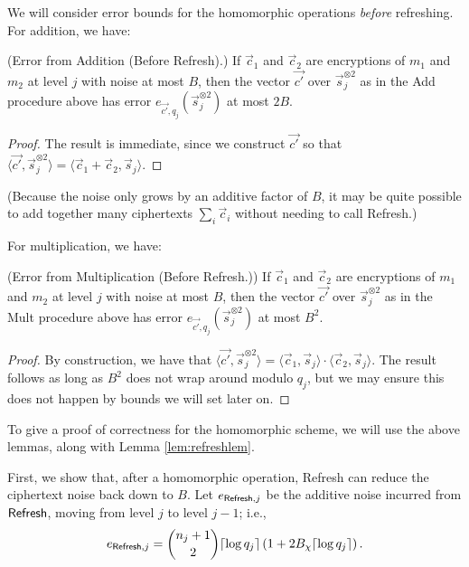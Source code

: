     We will consider error bounds for the homomorphic operations \emph{before} refreshing. For addition, we have:
    \begin{lemma} (Error from Addition (Before \textsf{Refresh}).)
        If $\vec{c}_1$ and $\vec{c}_2$ are encryptions of $m_1$ and $m_2$ at level $j$ with noise at most $B$, then the vector $\vec{c'}$ over $\vec{s}_j^{\otimes 2}$ as in the \textsf{Add} procedure above has error $e_{\vec{c'}, q_j}(\vec{s}_j^{\otimes 2})$ at most $2B$.
    \end{lemma}
    \begin{proof}
        The result is immediate, since we construct $\vec{c'}$ so that $\langle \vec{c'}, \vec{s}_j^{\otimes 2} \rangle = \langle \vec{c}_1 + \vec{c}_2, \vec{s}_j \rangle$.
    \end{proof}
    (Because the noise only grows by an additive factor of $B$, it may be quite possible to add together many ciphertexts $\sum_i \vec{c}_i$ without needing to call \textsf{Refresh}.)


    For multiplication, we have:
    \begin{lemma} (Error from Multiplication (Before \textsf{Refresh}.))
        If $\vec{c}_1$ and $\vec{c}_2$ are encryptions of $m_1$ and $m_2$ at level $j$ with noise at most $B$, then the vector $\vec{c'}$ over $\vec{s}_j^{\otimes 2}$ as in the \textsf{Mult} procedure above has error $e_{\vec{c'}, q_j}(\vec{s}_j^{\otimes 2})$ at most $B^2$.
    \end{lemma}
    \begin{proof}
        By construction, we have that $\langle \vec{c'}, \vec{s}_j^{\otimes 2} \rangle = \langle \vec{c}_1, \vec{s}_j \rangle \cdot \langle \vec{c}_2, \vec{s}_j \rangle$. The result follows as long as $B^2$ does not wrap around modulo $q_j$, but we may ensure this does not happen by bounds we will set later on.
    \end{proof}

    To give a proof of correctness for the homomorphic scheme, we will use the above lemmas, along with Lemma \ref{lem:refreshlem}.

    First, we show that, after a homomorphic operation, \textsf{Refresh} can reduce the ciphertext noise back down to $B$. Let $e_{{\sf Refresh}, j}$ be the additive noise incurred from ${\sf Refresh}$, moving from level $j$ to level $j-1$; i.e.,
    \[e_{{\sf Refresh}, j} = {{n_j + 1}\choose{2}} \lceil \log q_j \rceil \left( 1 + 2 B_\chi \lceil \log q_j \rceil \right).\]


